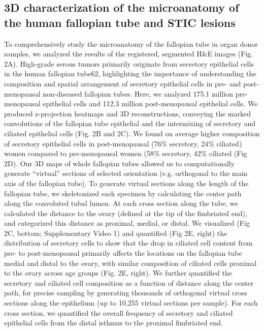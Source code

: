 \begin{refsection}
    \subsection{3D characterization of the microanatomy of the human fallopian tube and STIC lesions}
    To comprehensively study the microanatomy of the fallopian tube in organ donor samples, we analyzed the results of the registered, segmented H\&E images (Fig. 2A). High-grade serous tumors primarily originate from secretory epithelial cells in the human fallopian tube62, highlighting the importance of understanding the composition and spatial arrangement of secretory epithelial cells in pre- and post-menopausal non-diseased fallopian tubes. Here, we analyzed 175.1 million pre-menopausal epithelial cells and 112.3 million post-menopausal epithelial cells. We produced z-projection heatmaps and 3D reconstructions, conveying the marked convolutions of the fallopian tube epithelial and the intermixing of secretory and ciliated epithelial cells (Fig. 2B and 2C). We found on average higher composition of secretory epithelial cells in post-menopausal (76\% secretory, 24\% ciliated) women compared to pre-menopausal women (58\% secretory, 42\% ciliated (Fig 2D). 
    Our 3D maps of whole fallopian tubes allowed us to computationally generate “virtual” sections of selected orientation (e.g. orthogonal to the main axis of the fallopian tube). To generate virtual sections along the length of the fallopian tube, we skeletonized each specimen by calculating the center path along the convoluted tubal lumen. At each cross section along the tube, we calculated the distance to the ovary (defined at the tip of the fimbriated end), and categorized this distance as proximal, medial, or distal. We visualized (Fig 2C, bottom; Supplementary Video 1) and quantified (Fig 2E, right) the distribution of secretory cells to show that the drop in ciliated cell content from pre- to post-menopausal primarily affects the locations on the fallopian tube medial and distal to the ovary, with similar composition of ciliated cells proximal to the ovary across age groups (Fig. 2E, right). We further quantified the secretory and ciliated cell composition as a function of distance along the center path, for precise sampling by generating thousands of orthogonal virtual cross sections along the epithelium (up to 10,255 virtual sections per sample). For each cross section, we quantified the overall frequency of secretory and ciliated epithelial cells from the distal isthmus to the proximal fimbriated end. 

\end{refsection}
